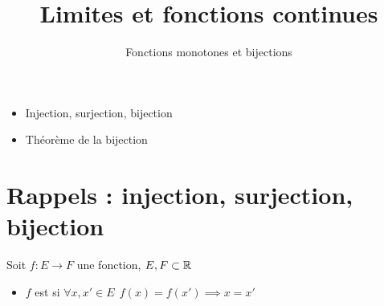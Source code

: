 








\title{{\bf Limites et fonctions continues}}
\subtitle{Fonctions monotones et bijections}

\begin{frame}
  
  \debutmontitre

  \pause

{\footnotesize
\hfill
{}
\begin{minipage}{0.6\textwidth}
  \begin{itemize}
    \item<3-> Injection, surjection, bijection
    \item<4-> Théorème de la bijection
  \end{itemize}
\end{minipage}
}

\end{frame}

\setcounter{framenumber}{0}




\section{Rappels : injection, surjection, bijection}

\begin{frame}

\begin{mydefinition}
Soit $f:E\to F$ une fonction, $E, F\subset \mathbb{R}$
\begin{itemize}
  \item $f$ est  si \quad $\forall x,x'\in E \ \ f(x)=f(x') \implies x=x'$ 
\end{itemize}
\end{mydefinition}



\end{frame}



